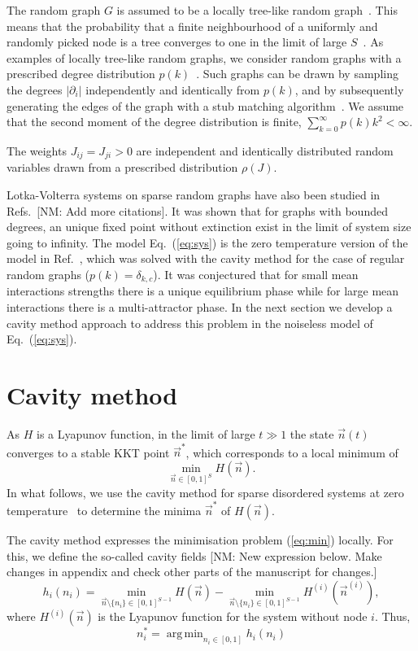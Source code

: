 \documentclass[11pt,a4paper]{article}
\DeclareMathOperator*{\argmin}{arg\,min}
\newcommand{\nm}[1]{{\color{red}[NM: #1]}}
\begin{document}
The random graph $G$  is assumed to be a locally tree-like random graph~\cite{dembo2010ising}.    This means that the probability that a  finite neighbourhood of a  uniformly and randomly picked node is a tree converges to one  in the limit of large $S$~\cite{bordenave2015}.   As  examples of locally tree-like random graphs, we consider random graphs with a prescribed degree distribution $p(k)$~\cite{}.   Such graphs can be drawn by sampling the degrees $|\partial_i|$ independently and identically from  $p(k)$, and by subsequently generating the edges of the graph with a stub matching algorithm~\cite{}.   We assume that the second moment of the degree distribution is finite,  $\sum^{\infty}_{k=0}p(k)k^2<\infty$.   

The weights $J_{ij}=J_{ji}>0$ are  independent and identically distributed random variables  drawn from a prescribed distribution $\rho(J)$.


Lotka-Volterra systems on sparse random graphs have also been studied in Refs.~\cite{mooij2024}\nm{Add more citations}.  It was shown that for graphs with bounded degrees, an unique fixed point without extinction exist in the limit of system size going to infinity. 
The model Eq.~(\ref{eq:sys}) is the zero temperature version of the model in Ref.~\cite{tonolo2025generalized}, which  was solved with the cavity method for the case of regular random graphs ($p(k) = \delta_{k,c}$).    It was conjectured that for small mean interactions strengths there is a unique equilibrium phase while for large mean interactions there is a multi-attractor phase.    In the next section we develop a  cavity method approach to address this problem in the noiseless model of Eq.~(\ref{eq:sys}).  


\section{Cavity method}
As $H$ is a Lyapunov function, in the limit of large $t\gg 1$ the state $\vec{n}(t)$  converges to a stable KKT  point $\vec{n}^\ast$, which corresponds to a local minimum of
\begin{equation}
\min_{\vec{n}\in [0,1]^S} H(\vec{n}).  \label{eq:min}
\end{equation}
In what follows, we use  the cavity method for sparse disordered systems at zero temperature~\cite{mezard2003cavity}  to determine the minima  $\vec{n}^\ast$ of $H(\vec{n})$.    


The cavity method expresses the minimisation problem (\ref{eq:min}) locally. 
For this, we  define the  so-called cavity fields
\nm{New expression below. Make changes in appendix and check other parts of the manuscript for changes.}
\begin{equation}
    h_i(n_i) = \min_{\vec n \setminus \{n_i\} \in [0,1]^{S-1}} H(\vec n) - \min_{\vec n \setminus \{n_i\} \in [0,1]^{S-1}}H^{(i)}(\vec n^{(i)}),
\end{equation}
where $H^{(i)}(\vec n)$ is the Lyapunov function for the system without node $i$.    Thus, 
\begin{equation}
    n^\ast_i = \argmin_{n_i \in [0,1]} h_i(n_i)   \label{eq:nast}
\end{equation}
\end{document}
